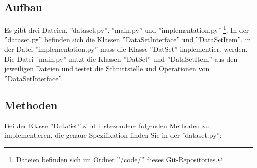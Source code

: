 \documentclass[
    oneside, %
    12pt, %
    a4paper, %
    parskip=full %
]{scrartcl}
\begin{document}
\subsection{Aufbau}



Es gibt drei Dateien, ''dataset.py'', ''main.py'' und ''implementation.py''
\footnote{Dateien befinden sich im Ordner ''/code/'' dieses Git-Repositories.}.
In der ''dataset.py'' befinden sich die Klassen ''DataSetInterface'' und ''DataSetItem'',
in der Datei ''implementation.py'' muss die Klasse ''DatSet'' implementiert werden.
Die Datei ''main.py'' nutzt die Klassen ''DatSet'' und ''DataSetItem'' aus den jeweiligen Dateien und testet die Schnittstelle und Operationen von ''DataSetInterface''.\\

\subsection{Methoden}

Bei der Klasse ''DataSet'' sind insbesondere folgenden Methoden zu implementieren, die genaue Spezifikation finden Sie in der ''dataset.py'':



\end{document}
